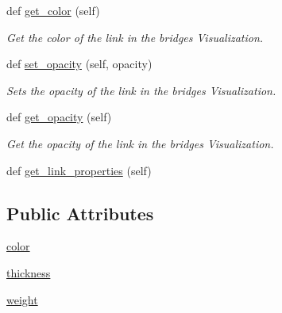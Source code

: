 \begin{DoxyCompactItemize}
def \hyperlink{class_bridges_1_1link__visualizer_1_1_link_visualizer_af3b061f20b383565b99b9b80d4901a60}{get\+\_\+color} (self)
\begin{DoxyCompactList}\small\item\em Get the color of the link in the bridges Visualization. \end{DoxyCompactList}\item 
def \hyperlink{class_bridges_1_1link__visualizer_1_1_link_visualizer_a46cb7057831aba1a5cd25d49552629e5}{set\+\_\+opacity} (self, opacity)
\begin{DoxyCompactList}\small\item\em Sets the opacity of the link in the bridges Visualization. \end{DoxyCompactList}\item 
def \hyperlink{class_bridges_1_1link__visualizer_1_1_link_visualizer_ad9623595bcbe1da3a19368a89d3bc7cb}{get\+\_\+opacity} (self)
\begin{DoxyCompactList}\small\item\em Get the opacity of the link in the bridges Visualization. \end{DoxyCompactList}\item 
def \hyperlink{class_bridges_1_1link__visualizer_1_1_link_visualizer_a3ea7e9b8eda72169ca2819a84cb5faa7}{get\+\_\+link\+\_\+properties} (self)
\end{DoxyCompactItemize}
\subsection*{Public Attributes}
\begin{DoxyCompactItemize}
\item 
\hyperlink{class_bridges_1_1link__visualizer_1_1_link_visualizer_a66caf26ee75f2f33f650e76a40c72488}{color}
\item 
\hyperlink{class_bridges_1_1link__visualizer_1_1_link_visualizer_acbc2abcd8584b20c14f3aa695cb5a668}{thickness}
\item 
\hyperlink{class_bridges_1_1link__visualizer_1_1_link_visualizer_a3cf821801816ca20db68e8122b159e96}{weight}
\end{DoxyCompactItemize}

